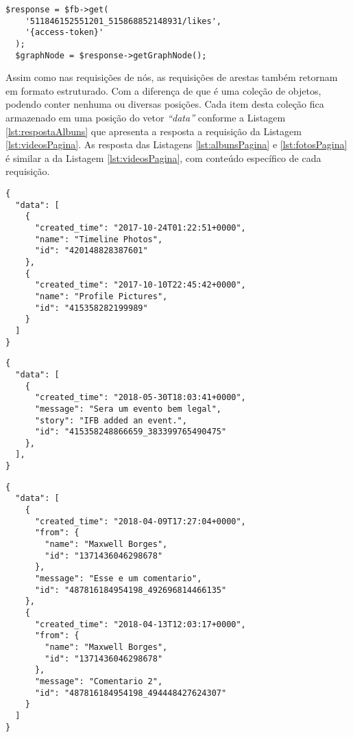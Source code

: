 \begin{lstlisting}[caption={Requisitar todas as curtidas de um comentário},label={lst:curtidasComentario}]
  $response = $fb->get( 
    '511846152551201_515868852148931/likes', 
    '{access-token}'
  );
  $graphNode = $response->getGraphNode();
\end{lstlisting}

Assim como nas requisições de nós, as requisições de arestas também retornam em formato estruturado. Com a diferença de que é uma coleção de objetos, podendo conter nenhuma ou diversas posições. Cada item desta coleção fica armazenado em uma posição do vetor \textit{``data''} conforme a Listagem \ref{lst:respostaAlbuns} que apresenta a resposta a requisição da Listagem \ref{lst:videosPagina}. As resposta das Listagens \ref{lst:albunsPagina} e \ref{lst:fotosPagina} é similar a da Listagem \ref{lst:videosPagina}, com conteúdo específico de cada requisição. 

\begin{lstlisting}[caption={Resposta das Listagens \ref{lst:albunsPagina}, \ref{lst:fotosPagina} e \ref{lst:videosPagina}  (Álbuns, Fotos e Videos)},label={lst:respostaAlbuns}]
{
  "data": [
    {
      "created_time": "2017-10-24T01:22:51+0000",
      "name": "Timeline Photos",
      "id": "420148828387601"
    },
    {
      "created_time": "2017-10-10T22:45:42+0000",
      "name": "Profile Pictures",
      "id": "415358282199989"
    }
  ]
}
\end{lstlisting}

\begin{lstlisting}[caption={Resposta da requisição \ref{lst:eventosPagina} (Eventos)},label={lst:respostaEventos}]
{
  "data": [
    {
      "created_time": "2018-05-30T18:03:41+0000",
      "message": "Sera um evento bem legal",
      "story": "IFB added an event.",
      "id": "415358248866659_383399765490475"
    },
  ],
}
\end{lstlisting} 

\begin{lstlisting}[caption={Resposta da requisição \ref{lst:comentariosPostagem} (Comentários)},label={lst:respostaComentarios}]
{
  "data": [
    {
      "created_time": "2018-04-09T17:27:04+0000",
      "from": {
        "name": "Maxwell Borges",
        "id": "1371436046298678"
      },
      "message": "Esse e um comentario",
      "id": "487816184954198_492696814466135"
    },
    {
      "created_time": "2018-04-13T12:03:17+0000",
      "from": {
        "name": "Maxwell Borges",
        "id": "1371436046298678"
      },
      "message": "Comentario 2",
      "id": "487816184954198_494448427624307"
    }
  ]
}
\end{lstlisting} 

